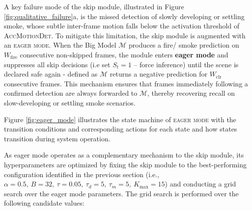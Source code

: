 \documentclass[
  10pt,
]{article}
\begin{document}


A key failure mode of the skip module, illustrated in Figure
\ref{fig:qualitative_failure}a, is the missed detection of slowly
developing or settling smoke, whose subtle inter-frame motion falls
below the activation threshold of \textsc{AccMotionDet}. To mitigate
this limitation, the skip module is augmented with an
\textsc{eager mode}. When the Big Model \(\mathcal{M}\) produces a fire/
smoke prediction on \(W_{\text{fire}}\) consecutive non-skipped frames,
the module enters \textbf{eager mode} and suppresses all skip decisions
(i.e set \(S_t = 1\) -- force inference) until the scene is declared
safe again - defined as \(\mathcal{M}\) returns a negative prediction
for \(W_{\text{clr}}\) consecutive frames. This mechanism ensures that
frames immediately following a confirmed detection are always forwarded
to \(\mathcal{M}\), thereby recovering recall on slow-developing or
settling smoke scenarios.

Figure \ref{fig:eager_mode} illustrates the state machine of
\textsc{eager mode} with the transition conditions and corresponding
actions for each state and how states transition during system
operation.



As eager mode operates as a complementary mechanism to the skip module,
its hyperparameters are optimized by fixing the skip module to the
best-performing configuration identified in the previous section (i.e.,
\(\alpha{=}0.5,\ B{=}32,\
\tau{=}0.05,\ \tau_d{=}5,\ \tau_m{=}5,\ K_{\max}{=}15\)) and conducting
a grid search over the eager mode parameters. The grid search is
performed over the following candidate values:
\end{document}
